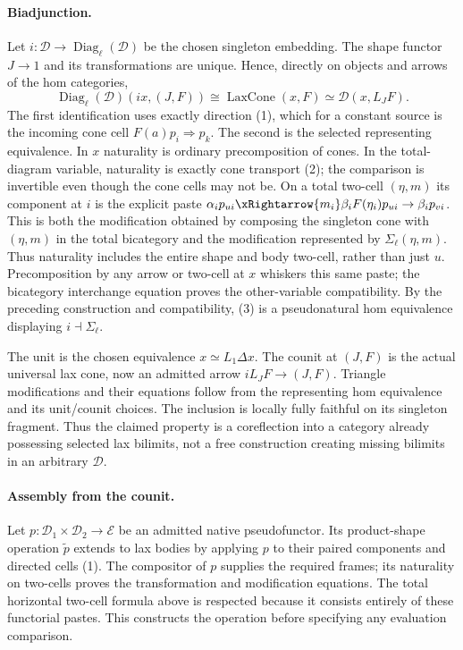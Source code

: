 \documentclass{article}
\begin{document}
\paragraph{Biadjunction.} Let $i:\mathcal D\to\operatorname{Diag}_{\ell}(\mathcal D)$ be the chosen singleton embedding. The shape functor $J\to1$ and its transformations are unique. Hence, directly on objects and arrows of the hom categories,
\[
 \operatorname{Diag}_{\ell}(\mathcal D)(ix,(J,F))
 \cong\operatorname{LaxCone}(x,F)
 \simeq\mathcal D(x,L_JF).
\tag{3}
\]
The first identification uses exactly direction (1), which for a constant source is the incoming cone cell $F(a)p_i\Rightarrow p_k$. The second is the selected representing equivalence. In $x$ naturality is ordinary precomposition of cones. In the total-diagram variable, naturality is exactly cone transport (2); the comparison is invertible even though the cone cells may not be. On a total two-cell $(\eta,m)$ its component at $i$ is the explicit paste $\alpha_i p_{ui}\xRightarrow{m_i}\beta_iF(\eta_i)p_{ui}\to\beta_i p_{vi}$. This is both the modification obtained by composing the singleton cone with $(\eta,m)$ in the total bicategory and the modification represented by $\Sigma_\ell(\eta,m)$. Thus naturality includes the entire shape and body two-cell, rather than just $u$. Precomposition by any arrow or two-cell at $x$ whiskers this same paste; the bicategory interchange equation proves the other-variable compatibility. By the preceding construction and compatibility, (3) is a pseudonatural hom equivalence displaying $i\dashv\Sigma_\ell$.

The unit is the chosen equivalence $x\simeq L_1\Delta x$. The counit at $(J,F)$ is the actual universal lax cone, now an admitted arrow $iL_JF\to(J,F)$. Triangle modifications and their equations follow from the representing hom equivalence and its unit/counit choices. The inclusion is locally fully faithful on its singleton fragment. Thus the claimed property is a coreflection into a category already possessing selected lax bilimits, not a free construction creating missing bilimits in an arbitrary $\mathcal D$.

\paragraph{Assembly from the counit.} Let $p:\mathcal D_1\times\mathcal D_2\to\mathcal E$ be an admitted native pseudofunctor. Its product-shape operation $\widetilde p$ extends to lax bodies by applying $p$ to their paired components and directed cells (1). The compositor of $p$ supplies the required frames; its naturality on two-cells proves the transformation and modification equations. The total horizontal two-cell formula above is respected because it consists entirely of these functorial pastes. This constructs the operation before specifying any evaluation comparison.
\end{document}
